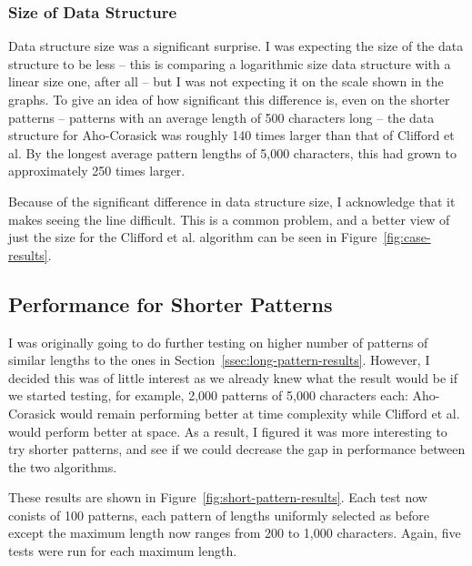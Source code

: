 \documentclass[ %
                    author={Dominic Joseph Moylett},
                    degree={MEng},
                     title={Dictionary Matching with Fingerprints},
                  subtitle={An Empirical Analysis},
                      type={research},
                      year={2015} ]{dissertation}
\begin{document}
\subsubsection{Size of Data Structure}

Data structure size was a significant surprise. I was expecting the size of the data structure to be less -- this is comparing a logarithmic size data structure with a linear size one, after all -- but I was not expecting it on the scale shown in the graphs. To give an idea of how significant this difference is, even on the shorter patterns -- patterns with an average length of 500 characters long -- the data structure for Aho-Corasick was roughly 140 times larger than that of Clifford et al. By the longest average pattern lengths of 5,000 characters, this had grown to approximately 250 times larger.

Because of the significant difference in data structure size, I acknowledge that it makes seeing the line difficult. This is a common problem, and a better view of just the size for the Clifford et al. algorithm can be seen in Figure~\ref{fig:case-results}.

\subsection{Performance for Shorter Patterns}
\label{ssec:short-pattern-results}

I was originally going to do further testing on higher number of patterns of similar lengths to the ones in Section~\ref{ssec:long-pattern-results}. However, I decided this was of little interest as we already knew what the result would be if we started testing, for example, 2,000 patterns of 5,000 characters each: Aho-Corasick would remain performing better at time complexity while Clifford et al. would perform better at space. As a result, I figured it was more interesting to try shorter patterns, and see if we could decrease the gap in performance between the two algorithms.

These results are shown in Figure~\ref{fig:short-pattern-results}. Each test now conists of 100 patterns, each pattern of lengths uniformly selected as before except the maximum length now ranges from 200 to 1,000 characters. Again, five tests were run for each maximum length.
\end{document}
